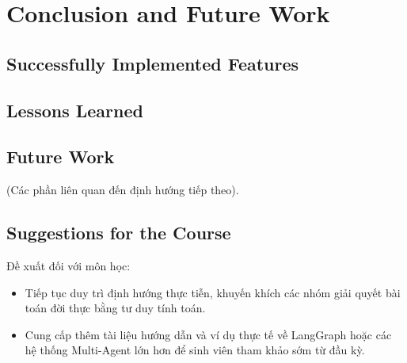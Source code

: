 \section{Conclusion and Future Work}

\subsection{Successfully Implemented Features}



\subsection{Lessons Learned}



\medskip


\subsection{Future Work}

 (Các phần liên quan đến định hướng tiếp theo).

\subsection{Suggestions for the Course}

Đề xuất đối với môn học:
\begin{itemize}
    \item Tiếp tục duy trì định hướng thực tiễn, khuyến khích các nhóm giải quyết bài toán đời thực bằng tư duy tính toán.
    \item Cung cấp thêm tài liệu hướng dẫn và ví dụ thực tế về LangGraph hoặc các hệ thống Multi-Agent lớn hơn để sinh viên tham khảo sớm từ đầu kỳ.
\end{itemize}
